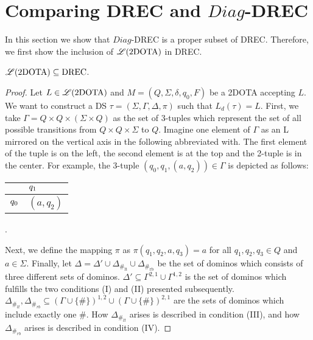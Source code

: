 \section{Comparing DREC and $Diag$-DREC}
In this section we show that $Diag$-DREC is a proper subset of DREC. Therefore, we first show the
inclusion of $\mathscr{L}(\text{2DOTA})$ in DREC.
\begin{lemma} 
$\mathscr{L}(\text{2DOTA})\subseteq\text{DREC}$.
\label{2dota_subsetequal_drec}
\end{lemma}
\begin{proof}
Let $L\in\mathscr{L}(\text{2DOTA})$ and $M = (Q, \Sigma, \delta, q_0, F)$ be a 2DOTA accepting $L$.
We want to construct a DS $\tau = (\Sigma, \Gamma, \Delta, \pi)$ such that $L_d(\tau) = L$. First,
we take $\Gamma = Q \times Q \times (\Sigma \times Q)$ as the set of 3-tuples which represent the
set of all possible transitions from $Q \times Q \times \Sigma$ to $Q$. Imagine one element of
$\Gamma$ as an L mirrored on the vertical axis in the following abbreviated with\mirroredL.
The first element of the tuple is on the left, the second element is at the top and the 2-tuple is
in the center. For example, the 3-tuple $(q_0, q_1, (a, q_2))\in\Gamma$ is depicted as follows:
\vspace{0.4cm}
\begin{center}
\begin{tabular}{C{1.5cm}|C{1.5cm}|} 
                            & $\hspace{0.008cm}q_1\hspace{0.008cm}$      \tabularnewline
\hline 
{} & $(a, q_2)$ \tabularnewline
\hline 
\end{tabular}.
\end{center}
\vspace{1.2em}
Next, we define the mapping $\pi$ as $\pi(q_1, q_2, a, q_3) = a$ for all $q_1, q_2, q_3 \in
Q$ and $a \in \Sigma$. Finally, let $\Delta = \Delta' \cup
\Delta_{\#_{\text{lt}}} \cup \Delta_{\#_{\text{rb}}}$ be the set of dominos
which consists of three different sets of dominos.
$\Delta'\subseteq\Gamma^{2,1}\cup\Gamma^{1,2}$ is the set of dominos which fulfills the two
conditions (I) and (II) presented subsequently.
$\Delta_{\#_{lt}},
\Delta_{\#_{rb}}\subseteq{(\Gamma\cup\{\#\})}^{1,2}\cup{(\Gamma\cup\{\#\})}^{2,1}$ are the sets of
dominos which include exactly one $\#$. How $\Delta_{\#_{lt}}$ arises is described in condition
(III), and how $\Delta_{\#_{rb}}$ arises is described in condition (IV).


\end{proof}
